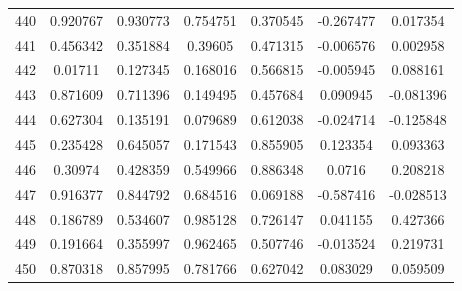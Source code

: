 \begin{table}
\begin{tabular}{c|c|c|c|c|c|c}
440 & 0.920767 & 0.930773 & 0.754751 & 0.370545 & -0.267477 & 0.017354\\
441 & 0.456342 & 0.351884 & 0.39605 & 0.471315 & -0.006576 & 0.002958\\
442 & 0.01711 & 0.127345 & 0.168016 & 0.566815 & -0.005945 & 0.088161\\
443 & 0.871609 & 0.711396 & 0.149495 & 0.457684 & 0.090945 & -0.081396\\
444 & 0.627304 & 0.135191 & 0.079689 & 0.612038 & -0.024714 & -0.125848\\
445 & 0.235428 & 0.645057 & 0.171543 & 0.855905 & 0.123354 & 0.093363\\
446 & 0.30974 & 0.428359 & 0.549966 & 0.886348 & 0.0716 & 0.208218\\
447 & 0.916377 & 0.844792 & 0.684516 & 0.069188 & -0.587416 & -0.028513\\
448 & 0.186789 & 0.534607 & 0.985128 & 0.726147 & 0.041155 & 0.427366\\
449 & 0.191664 & 0.355997 & 0.962465 & 0.507746 & -0.013524 & 0.219731\\
450 & 0.870318 & 0.857995 & 0.781766 & 0.627042 & 0.083029 & 0.059509\\
\end{tabular}
\end{table}
\newpage
